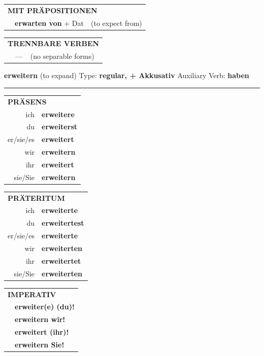 \documentclass[10pt,a4paper]{revtex4-2}
\begin{document}
\begin{verbbox}
\vspace{10pt}

\begin{tabular}{lll}
\multicolumn{3}{l}{\textbf{MIT PRÄPOSITIONEN}}\\
& \textbf{erwarten von} + Dat & (to expect from)\\
\end{tabular}
\hfill
\begin{tabular}{lll}
\multicolumn{3}{l}{\textbf{TRENNBARE VERBEN}}\\
& --- & (no separable forms)\\
\end{tabular}
\vspace{-5pt}
\end{verbbox}

\begin{verbbox-acc}
{\Large \bf erweitern} (to expand) \hfill Type: \textbf{regular, + Akkusativ} \hfill Auxiliary Verb: \textbf{haben}

\vspace{5pt}
\hrule
\vspace{5pt}

\begin{tabular}{rl}
\multicolumn{2}{l}{\textbf{PRÄSENS}}\\
ich & \textbf{erweitere}\\
du & \textbf{erweiterst}\\
er/sie/es & \textbf{erweitert}\\
wir & \textbf{erweitern}\\
ihr & \textbf{erweitert}\\
sie/Sie & \textbf{erweitern}\\
\end{tabular}
\hfill
\begin{tabular}{rl}
\multicolumn{2}{l}{\textbf{PRÄTERITUM}}\\
ich & \textbf{erweiterte}\\
du & \textbf{erweitertest}\\
er/sie/es & \textbf{erweiterte}\\
wir & \textbf{erweiterten}\\
ihr & \textbf{erweitertet}\\
sie/Sie & \textbf{erweiterten}\\
\end{tabular}
\hfill
\begin{tabular}{rl}
\multicolumn{2}{l}{\textbf{IMPERATIV}}\\
& \textbf{erweiter(e) (du)!}\\
& \textbf{erweitern wir!}\\
& \textbf{erweitert (ihr)!}\\
& \textbf{erweitern Sie!}\\
\end{tabular}


\end{verbbox-acc}
\end{document}
